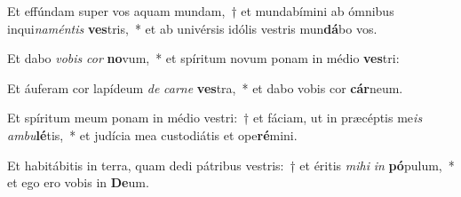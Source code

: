 \item Et effúndam super vos aquam mundam,~† et mundabímini ab ómnibus inqui\textit{na}\textit{mén}\textit{tis} \textbf{ves}tris,~* et ab univérsis idólis vestris mun\textbf{dá}bo vos.
\item Et dabo \textit{vo}\textit{bis} \textit{cor} \textbf{no}vum,~* et spíritum novum ponam in médio \textbf{ves}tri:
\item Et áuferam cor lapídeum \textit{de} \textit{car}\textit{ne} \textbf{ves}tra,~* et dabo vobis cor \textbf{cár}neum.
\item Et spíritum meum ponam in médio vestri:~† et fáciam, ut in præcéptis me\textit{is} \textit{am}\textit{bu}\textbf{lé}tis,~* et judícia mea custodiátis et ope\textbf{ré}mini.
\item Et habitábitis in terra, quam dedi pátribus vestris:~† et éritis \textit{mi}\textit{hi} \textit{in} \textbf{pó}pulum,~* et ego ero vobis in \textbf{De}um.
